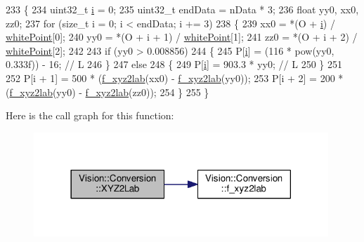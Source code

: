 \begin{DoxyCode}
233     \{
234         uint32\_t \hyperlink{_comparision_pictures_2_createtest_image_8m_a6f6ccfcf58b31cb6412107d9d5281426}{i} = 0;
235         uint32\_t endData = nData * 3;
236         \textcolor{keywordtype}{float} yy0, xx0, zz0;
237         \textcolor{keywordflow}{for} (\textcolor{keywordtype}{size\_t} i = 0; i < endData; i += 3)
238         \{
239             xx0 = *(O + \hyperlink{_comparision_pictures_2_createtest_image_8m_a6f6ccfcf58b31cb6412107d9d5281426}{i}) / \hyperlink{class_vision_1_1_conversion_adbaed406827f7ffb583d003815a9f3f8}{whitePoint}[0];
240             yy0 = *(O + i + 1) / \hyperlink{class_vision_1_1_conversion_adbaed406827f7ffb583d003815a9f3f8}{whitePoint}[1];
241             zz0 = *(O + i + 2) / \hyperlink{class_vision_1_1_conversion_adbaed406827f7ffb583d003815a9f3f8}{whitePoint}[2];
242 
243             \textcolor{keywordflow}{if} (yy0 > 0.008856)
244             \{
245                 P[\hyperlink{_comparision_pictures_2_createtest_image_8m_a6f6ccfcf58b31cb6412107d9d5281426}{i}] = (116 * pow(yy0, 0.333f)) - 16; \textcolor{comment}{// L}
246             \}
247             \textcolor{keywordflow}{else}
248             \{
249                 P[\hyperlink{_comparision_pictures_2_createtest_image_8m_a6f6ccfcf58b31cb6412107d9d5281426}{i}] = 903.3 * yy0; \textcolor{comment}{// L}
250             \}
251 
252             P[i + 1] = 500 * (\hyperlink{class_vision_1_1_conversion_aea73f90915cd0459dcaf70fb3e109a82}{f\_xyz2lab}(xx0) - \hyperlink{class_vision_1_1_conversion_aea73f90915cd0459dcaf70fb3e109a82}{f\_xyz2lab}(yy0));
253             P[i + 2] = 200 * (\hyperlink{class_vision_1_1_conversion_aea73f90915cd0459dcaf70fb3e109a82}{f\_xyz2lab}(yy0) - \hyperlink{class_vision_1_1_conversion_aea73f90915cd0459dcaf70fb3e109a82}{f\_xyz2lab}(zz0));
254         \}
255     \}
\end{DoxyCode}


Here is the call graph for this function\+:\nopagebreak
\begin{figure}[H]
\begin{center}
\leavevmode
\includegraphics[width=314pt]{class_vision_1_1_conversion_a9ecc41c4226eafc55d0ee0cc550e593b_cgraph}
\end{center}
\end{figure}




